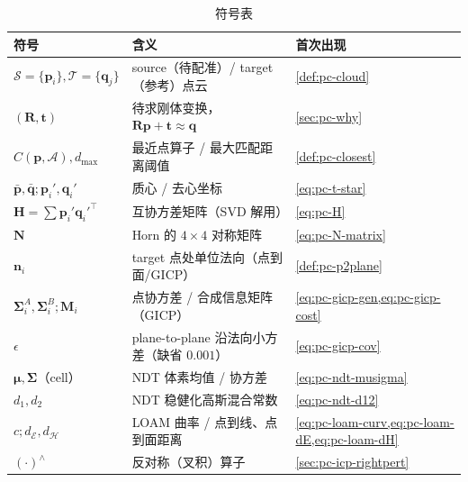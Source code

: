 \begin{table}[H]\centering\small
\caption{符号表}
\begin{tabular}{lll}
\toprule
符号 & 含义 & 首次出现 \\
\midrule
$\mathcal{S}=\{\mathbf{p}_i\},\mathcal{T}=\{\mathbf{q}_j\}$ & source（待配准）/ target（参考）点云 & \cref{def:pc-cloud} \\
$(\mathbf{R},\mathbf{t})$ & 待求刚体变换，$\mathbf{R}\mathbf{p}+\mathbf{t}\approx\mathbf{q}$ & \cref{sec:pc-why} \\
$C(\mathbf{p},\mathcal{A}),d_{\max}$ & 最近点算子 / 最大匹配距离阈值 & \cref{def:pc-closest} \\
$\bar{\mathbf{p}},\bar{\mathbf{q}};\mathbf{p}_i',\mathbf{q}_i'$ & 质心 / 去心坐标 & \cref{eq:pc-t-star} \\
$\mathbf{H}=\sum\mathbf{p}_i'\mathbf{q}_i'^\top$ & 互协方差矩阵（SVD 解用） & \cref{eq:pc-H} \\
$\mathbf{N}$ & Horn 的 $4\times4$ 对称矩阵 & \cref{eq:pc-N-matrix} \\
$\mathbf{n}_i$ & target 点处单位法向（点到面/GICP） & \cref{def:pc-p2plane} \\
$\boldsymbol{\Sigma}_i^A,\boldsymbol{\Sigma}_i^B;\mathbf{M}_i$ & 点协方差 / 合成信息矩阵（GICP） & \cref{eq:pc-gicp-gen,eq:pc-gicp-cost} \\
$\epsilon$ & plane-to-plane 沿法向小方差（缺省 $0.001$） & \cref{eq:pc-gicp-cov} \\
$\boldsymbol{\mu},\boldsymbol{\Sigma}$（cell） & NDT 体素均值 / 协方差 & \cref{eq:pc-ndt-musigma} \\
$d_1,d_2$ & NDT 稳健化高斯混合常数 & \cref{eq:pc-ndt-d12} \\
$c;d_{\mathcal{E}},d_{\mathcal{H}}$ & LOAM 曲率 / 点到线、点到面距离 & \cref{eq:pc-loam-curv,eq:pc-loam-dE,eq:pc-loam-dH} \\
$(\cdot)^\wedge$ & 反对称（叉积）算子 & \cref{sec:pc-icp-rightpert} \\
\bottomrule
\end{tabular}
\end{table}

